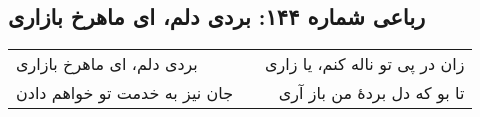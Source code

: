 \begin{center}
\section*{رباعی شماره ۱۴۴: بردی دلم، ای ماهرخ بازاری}
\label{sec:144}
\begin{longtable}{l p{0.5cm} r}
بردی دلم، ای ماهرخ بازاری
&&
زان در پی تو ناله کنم، یا زاری
\\
جان نیز به خدمت تو خواهم دادن
&&
تا بو که دل بردهٔ من باز آری
\\
\end{longtable}
\end{center}
